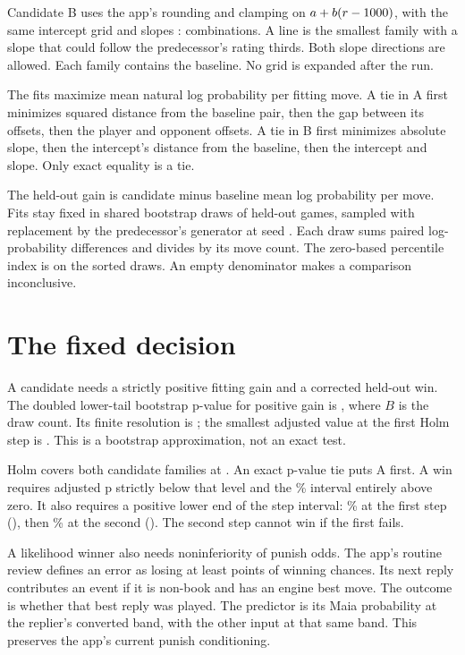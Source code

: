 \documentclass{article}
\begin{document}
Candidate B uses the app's rounding and clamping on
$a+b(r-1000)$, with the same intercept grid and slopes \Slopes:
\BCount{} combinations. A line is the smallest family with a slope that
could follow the predecessor's rating thirds. Both slope directions are
allowed. Each family contains the baseline. No grid is expanded after the
run.

The fits maximize mean natural log probability per fitting move. A tie in
A first minimizes squared distance from the baseline pair, then the gap
between its offsets, then the player and opponent offsets. A tie in B first
minimizes absolute slope, then the intercept's distance from the baseline,
then the intercept and slope. Only exact equality is a tie.

The held-out gain is candidate minus baseline mean log probability per
move. Fits stay fixed in \Draws{} shared bootstrap draws of held-out games,
sampled with replacement by the predecessor's generator at seed \Seed.
Each draw sums paired log-probability differences and divides by its move
count. The zero-based percentile index is \QuantileFormula{} on the sorted draws.
An empty denominator makes a comparison inconclusive.

\section{The fixed decision}
A candidate needs a strictly positive fitting gain and a corrected
held-out win. The doubled lower-tail bootstrap p-value for positive gain is
\TailFormula, where $B$ is the draw count. Its finite resolution is
\PResolution; the smallest adjusted value at the first Holm step is
\HolmMinimum. This is a bootstrap approximation, not an exact test.

Holm covers both candidate families at \Alpha. An exact p-value tie puts A
first. A win requires adjusted p strictly below that level and the
\OrdinaryCI\% interval entirely above zero. It also requires a positive
lower end of the step interval: \AdjustedCI\% at the first step
(\StageQuantiles), then \OrdinaryCI\% at the second
(\OrdinaryQuantiles). The second step cannot win if the first fails.

A likelihood winner also needs noninferiority of punish odds. The app's
routine review defines an error as losing at least \ErrorLoss{} points of
winning chances. Its next reply contributes an event if it is non-book and
has an engine best move. The outcome is whether that best reply was played.
The predictor is its Maia probability at the replier's converted band,
with the other input at that same band. This preserves the app's current
punish conditioning.
\end{document}
